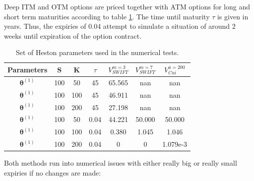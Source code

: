 \documentclass[12,twoside]{mammeTFM}
\theoremstyle{definition}
\theoremstyle{remark}
\begin{document}
Deep ITM and OTM options are priced together with ATM options for long and short term maturities according to table \ref{table:stress}. The time until maturity $\tau$ is given in years. Thus, the expiries of 0.04 attempt to simulate a situation of around 2 weeks until expiration of the option contract.

\begin{table}[!h]
\begin{center}
 \begin{tabular}{|c | c | c | c | c | c | c |} 
 \hline
 Parameters & S & K & $\tau$ & $V_{SWIFT}^{m=3}$ & $V_{SWIFT}^{m=7}$ & $V_{Cui}^{\overline{u} = 200}$ \\ [0.5ex] 
 \hline
 $\boldsymbol{\theta}^{(1)}$ & 100 & 50  & 45   & 65.565 & nan & nan \\ 
 \hline
 $\boldsymbol{\theta}^{(1)}$ & 100 & 100 & 45   & 46.911 & nan & nan \\ 
 \hline
 $\boldsymbol{\theta}^{(1)}$ & 100 & 200 & 45   & 27.198 & nan & nan \\ 
 \hline
 $\boldsymbol{\theta}^{(1)}$ & 100 & 50  & 0.04 & 44.221 & 50.000 & 50.000 \\ 
 \hline
 $\boldsymbol{\theta}^{(1)}$ & 100 & 100 & 0.04 & 0.380  & 1.045 & 1.046 \\ 
 \hline
 $\boldsymbol{\theta}^{(1)}$ & 100 & 200 & 0.04 & 0      & 0 & 1.079e-3 \\
 \hline
\end{tabular}
\end{center}
\caption{Set of Heston parameters used in the numerical tests.}\label{table:stress}
\end{table}

Both methods run into numerical issues with either really big or really small expiries if no changes are made:
\end{document}
